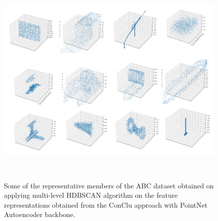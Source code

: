 \begin{figure}[t]
  \centering
  \includegraphics[width=400pt,height=300pt]{pictures/all_objs.PNG}
  \caption{Some of the representative members of the ABC dataset\cite{Koch_2019_CVPR} obtained on applying multi-level \ac{HDBSCAN} algorithm on the feature representations obtained from the ConClu approach with PointNet Autoencoder backbone.}
  \label{fig:all_hdbscan_objs}
\end{figure}

